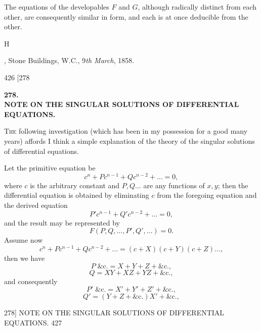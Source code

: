 \documentclass[11pt]{article}
\begin{document}
The equations of the developables $F$ and $G$, although radically distinct from each
other, are consequently similar in form, and each is at once deducible from the other.

\medskip
\hfill H

\medskip
{}, Stone Buildings, W.C., 9\textit{th March}, 1858.

\begin{center}
426 \hfill \hfill \textsc{[278}
\end{center}

\begin{center}
\textbf{\large 278.}\\[0.6em]
\textbf{NOTE ON THE SINGULAR SOLUTIONS OF DIFFERENTIAL}\\[0.2em]
\textbf{EQUATIONS.}
\end{center}

\medskip
{}
\medskip

\textsc{The} following investigation (which has been in my possession for a good many
years) affords I think a simple explanation of the theory of the singular solutions of
differential equations.

Let the primitive equation be
\[ c^{n}+Pc^{n-1}+Qc^{n-2}+\dots=0, \]
where $c$ is the arbitrary constant and $P,Q\dots$ are any functions of $x,y$; then the
differential equation is obtained by eliminating $c$ from the foregoing equation and the
derived equation
\[ P'c^{n-1}+Q'c^{n-2}+\dots=0, \]
and the result may be represented by
\[ F(P,Q,\dots,P',Q',\dots)=0. \]
Assume now
\[ c^{n}+Pc^{n-1}+Qc^{n-2}+\dots=(c+X)(c+Y)(c+Z)\dots, \]
then we have
\[ P\;\&\mathrm{c}.=X+Y+Z+\&\mathrm{c}., \]
\[ Q=XY+XZ+YZ+\&\mathrm{c}., \]
and consequently
\[ P'\;\&\mathrm{c}.=X'+Y'+Z'+\&\mathrm{c}., \]
\[ Q'=(Y+Z+\&\mathrm{c}.)X'+\&\mathrm{c}., \]

\begin{center}
\textsc{278]} \hfill NOTE ON THE SINGULAR SOLUTIONS OF DIFFERENTIAL EQUATIONS. \hfill 427
\end{center}
\end{document}
